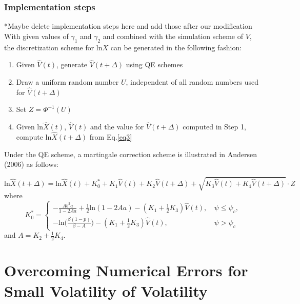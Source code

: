 \documentclass{ws-ijfe}
\begin{document}
\subsubsection{Implementation steps}
\textcolor[rgb]{1.00,0.00,0.00}{*Maybe delete implementation steps here and add those after our modification}\\
With given values of $\gamma_1$ and $\gamma_2$ and combined with the simulation scheme of $V$, the discretization scheme for ln$X$ can be generated in the following fashion:
\begin{enumerate}
  \item Given $\hat{V}(t)$, generate $\hat{V}(t+\Delta)$ using QE schemes
  \item Draw a uniform random number $U$, independent of all random numbers used for $\hat{V}(t+\Delta)$
  \item Set $Z=\Phi^{-1}(U)$
  \item Given ln$\hat{X}(t)$, $\hat{V}(t)$ and the value for $\hat{V}(t+\Delta)$ computed in Step 1, compute ln$\hat{X}(t+\Delta)$ from Eq.\eqref{eq3}
\end{enumerate}

Under the QE scheme, a martingale correction scheme is illustrated in Andersen (2006) as follows:

\begin{equation*}
  \text{ln}\hat{X}(t+\Delta)=\text{ln}\hat{X}(t)+K_0^*+K_1\hat{V}(t)+K_2\hat{V}(t+\Delta)+\sqrt{K_3\hat{V}(t)+K_4\hat{V}(t+\Delta)}\cdot Z
\end{equation*}
where
\[
  K_0^*=
  \begin{cases}
    -\frac{Ab^2a}{1-2Aa}+\frac{1}{2}\text{ln}(1-2Aa)-(K_1+\frac{1}{2}{K_3}){\hat{V}(t)},\,&\psi\leq\psi_c,\\
    -\text{ln}\bigg(\frac{\beta(1-p)}{\beta-A}\bigg)-(K_1+\frac{1}{2}{K_3}){\hat{V}(t)},&\psi>\psi_c
  \end{cases}
  \]
and $A=K_2+\frac{1}{2}K_4$.
\section{Overcoming Numerical Errors for Small Volatility of Volatility}
\end{document}
